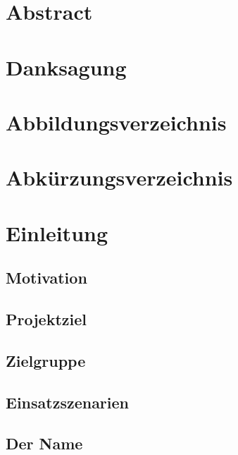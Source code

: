 \documentclass[11pt,ngerman,toc=listof,index=totoc]{scrreprt}
\begin{document}
{
\setcounter{tocdepth}{2}
\tableofcontents
}
\newpage

 \setcounter{page}{1}

\chapter{Abstract}\label{abstract}

\chapter{Danksagung}\label{danksagung}

\chapter{Abbildungsverzeichnis}\label{abbildungsverzeichnis}

\chapter{Abkürzungsverzeichnis}\label{abkuxfcrzungsverzeichnis}

\chapter{Einleitung}\label{einleitung}

\section{Motivation}\label{motivation}

\section{Projektziel}\label{projektziel}

\section{Zielgruppe}\label{zielgruppe}

\section{Einsatzszenarien}\label{einsatzszenarien}

\section{Der Name}\label{der-name}
\end{document}
